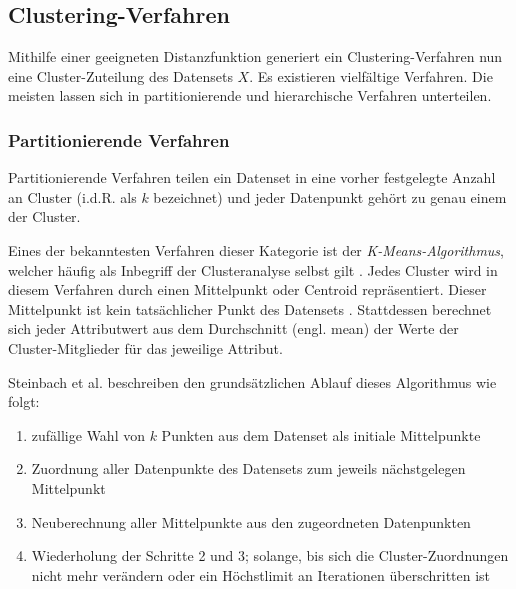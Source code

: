 \hypertarget{clustering-verfahren}{%
\subsection{Clustering-Verfahren}\label{clustering-verfahren}}

Mithilfe einer geeigneten Distanzfunktion generiert ein
Clustering-Verfahren nun eine Cluster-Zuteilung des Datensets \(X\). Es
existieren vielfältige Verfahren. Die meisten lassen sich in
partitionierende und hierarchische Verfahren unterteilen. \autocite[Kap.
1.3 Which Clustering Algorithm to Choose]{kaufman2009}

\hypertarget{partitionierende-verfahren}{%
\subsubsection{Partitionierende
Verfahren}\label{partitionierende-verfahren}}

Partitionierende Verfahren teilen ein Datenset in eine vorher
festgelegte Anzahl an Cluster (i.d.R. als \(k\) bezeichnet) und jeder
Datenpunkt gehört zu genau einem der Cluster. \autocite[Kap. 1.3.1
Partitioning Methods]{kaufman2009}

Eines der bekanntesten Verfahren dieser Kategorie ist der
\emph{K-Means-Algorithmus}, welcher häufig als Inbegriff der
Clusteranalyse selbst gilt \autocite{huang1998}. Jedes Cluster wird in
diesem Verfahren durch einen Mittelpunkt oder Centroid repräsentiert.
Dieser Mittelpunkt ist kein tatsächlicher Punkt des Datensets
\autocite{steinbach2000}. Stattdessen berechnet sich jeder Attributwert
aus dem Durchschnitt (engl. mean) der Werte der Cluster-Mitglieder für
das jeweilige Attribut. \autocite[Kap. 4.5 K-Means Algorithm]{king2015}

Steinbach et al. \autocite{steinbach2000} beschreiben den
grundsätzlichen Ablauf dieses Algorithmus wie folgt:

\begin{enumerate}
\def\labelenumi{\arabic{enumi}.}
\tightlist
\item
  zufällige Wahl von \(k\) Punkten aus dem Datenset als initiale
  Mittelpunkte
\item
  Zuordnung aller Datenpunkte des Datensets zum jeweils nächstgelegen
  Mittelpunkt
\item
  Neuberechnung aller Mittelpunkte aus den zugeordneten Datenpunkten
\item
  Wiederholung der Schritte 2 und 3; solange, bis sich die
  Cluster-Zuordnungen nicht mehr verändern oder ein Höchstlimit an
  Iterationen überschritten ist
\end{enumerate}

